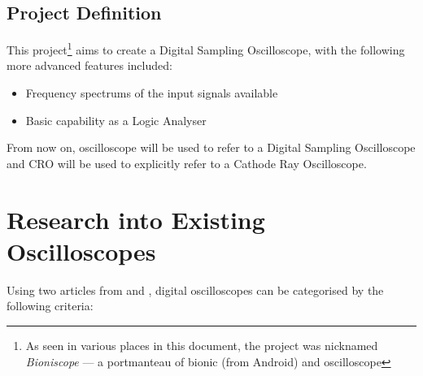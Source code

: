 \subsection*{Project Definition}

This project\footnote{As seen in various places in this document, the project
  was nicknamed \textit{Bioniscope} --- a portmanteau of bionic (from Android)
and oscilloscope} aims to create a Digital Sampling Oscilloscope, with the following
more advanced features included:

\begin{itemize}
  \item Frequency spectrums of the input signals available
  \item Basic capability as a Logic Analyser
\end{itemize}

From now on, oscilloscope will be used to refer to a Digital Sampling
Oscilloscope and CRO will be used to explicitly refer to a Cathode Ray
Oscilloscope.

\section{Research into Existing Oscilloscopes}

Using two articles from \autocite{PicotechScopes} and
\autocite{GabotronicsScopes}, digital
oscilloscopes can be categorised by the following criteria:

